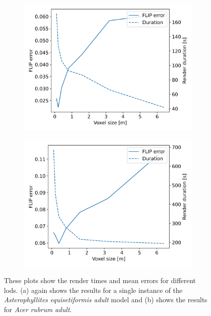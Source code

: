 \begin{figure}[ht]
    \centering
    \begin{subfigure}[b]{0.49\linewidth}
        \centering
        \includegraphics[width=1\linewidth]{img/results/performance_quality_PR04a.png}
        \caption{}
    \end{subfigure}
    \begin{subfigure}[b]{0.49\linewidth}
        \centering
        \includegraphics[width=1\linewidth]{img/results/performance_quality_EA01a.png}
        \caption{}
    \end{subfigure}
	\caption[Plots of \FLIP error and rendertimes for different \acsp{lod}]{These plots show the render times and mean \FLIP errors for different \acsp{lod}. (a) again shows the results for a single instance of the \textit{Asterophyllites equisetiformis adult} model and (b) shows the results for \textit{Acer rubrum adult}.}
	\label{fig:performance_quality}
\end{figure}
